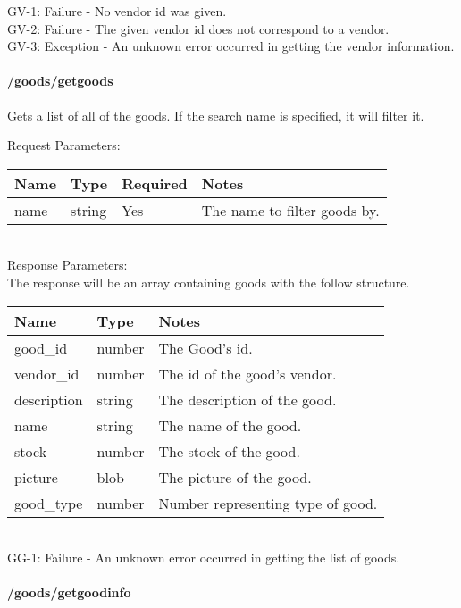 \documentclass{article}[11pt]
\begin{document}
\ErrorsSession
GV-1: Failure - No vendor id was given. \\
GV-2: Failure - The given vendor id does not correspond to a vendor. \\
GV-3: Exception - An unknown error occurred in getting the vendor information. \\

\paragraph{/goods/getgoods}\textbf{}

Gets a list of all of the goods. If the search name is specified, it will filter it.

\noindent
Request Parameters:

\noindent
\begin{tabular}{|l|l|l|l|}
\hline
\textbf{Name} & \textbf{Type} & \textbf{Required} & \textbf{Notes} \\
\hline
name & string & Yes & The name to filter goods by. \\
\hline
\end{tabular} \\

\noindent
Response Parameters: \\

\noindent
The response will be an array containing goods with the follow structure.

\noindent
\begin{tabular}{|l|l|l|}
\hline
\textbf{Name} & \textbf{Type} & \textbf{Notes} \\
\hline
good\_id & number & The Good's id. \\
vendor\_id & number & The id of the good's vendor. \\
description & string & The description of the good. \\
name & string & The name of the good. \\
stock & number & The stock of the good. \\
picture & blob & The picture of the good. \\
good\_type & number & Number representing type of good. \\
\hline
\end{tabular} \\

\ErrorsSession
GG-1: Failure - An unknown error occurred in getting the list of goods. \\

\paragraph{/goods/getgoodinfo}\textbf{}
\end{document}
